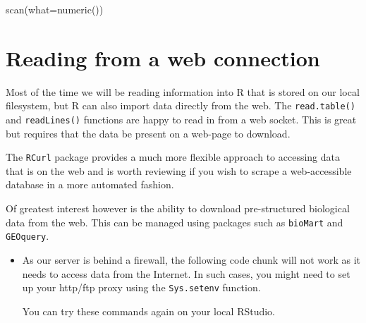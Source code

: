 \documentclass[a4paper]{book}
\newenvironment{Shaded}{}{}
\newcommand{\KeywordTok}[1]{\textcolor[rgb]{0.00,0.00,1.00}{{#1}}}
\newcommand{\DataTypeTok}[1]{{#1}}
\newcommand{\NormalTok}[1]{{#1}}
\newlength{\leftbarwidth}
\newlength{\leftbarsep}
\newcommand*{\leftbarcolorcmd}{\color{darkgray}}%
\renewenvironment{leftbar}{%
    \def\FrameCommand{{\leftbarcolorcmd{\vrule width \leftbarwidth\relax\hspace {\leftbarsep}}}}%
    \MakeFramed {\advance \hsize -\width \FrameRestore }%
}{%
    \endMakeFramed
}
\renewenvironment{Shaded}
{\vspace{0em}\begin{leftbar}\begin{snugshade}}
{\end{snugshade}\end{leftbar}\vspace{0pt}}
\newenvironment{rmdblock}[1]
  {\vspace{1.5em}\begin{shaded*}
  \begin{itemize}
  \renewcommand{\labelitemi}{
    \raisebox{-.7\height}[0pt][0pt]{
      {\setkeys{Gin}{width=3em,keepaspectratio}\texttt{[image: images/\#1]}}
    }
  }
  \item
  }
  {
  \end{itemize}
  \end{shaded*}
  }
\newenvironment{rmdcaution}
  {\begin{rmdblock}{caution}}
  {\end{rmdblock}}
\begin{document}
\begin{Shaded}
\begin{Highlighting}[]
\KeywordTok{scan}\NormalTok{(}\DataTypeTok{what=}\KeywordTok{numeric}\NormalTok{())}
\end{Highlighting}
\end{Shaded}

\section{Reading from a web
connection}\label{reading-from-a-web-connection}

Most of the time we will be reading information into R that is stored on
our local filesystem, but R can also import data directly from the web.
The \texttt{read.table()} and \texttt{readLines()} functions are happy
to read in from a web socket. This is great but requires that the data
be present on a web-page to download.

The \texttt{RCurl} package provides a much more flexible approach to
accessing data that is on the web and is worth reviewing if you wish to
scrape a web-accessible database in a more automated fashion.

Of greatest interest however is the ability to download pre-structured
biological data from the web. This can be managed using packages such as
\texttt{bioMart} and \texttt{GEOquery}.

\begin{rmdcaution}
As our server is behind a firewall, the following code chunk will not
work as it needs to access data from the Internet. In such cases, you
might need to set up your http/ftp proxy using the \texttt{Sys.setenv}
function.

You can try these commands again on your local RStudio.
\end{rmdcaution}
\end{document}
